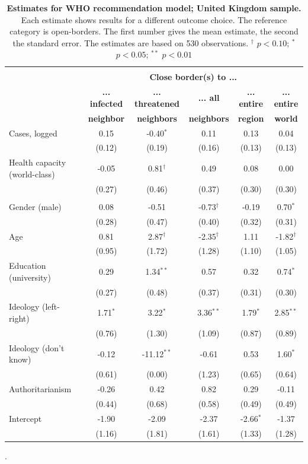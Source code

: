 \begin{table}[ht!]
\begin{center}
\footnotesize
\renewcommand{\arraystretch}{1.05}
\begin{tabular}{@{\extracolsep{4.8pt}}lccccc} 
\\[-1.8ex]\hline \\[-1.8ex]
 & \multicolumn{5}{c}{\normalsize{\textbf{Close border(s) to ...}}}
\\
  & \small{\textbf{... infected}} & \small{\textbf{... threatened}} & \small{\textbf{... all}} & \small{\textbf{... entire }} & \small{\textbf{... entire}}
 \\
  & \small{\textbf{neighbor}} & \small{\textbf{neighbors}} & \small{\textbf{neighbors}} & \small{\textbf{region}} & \small{\textbf{world}}
 \\
\hline
Cases, logged & 0.15 & -0.40$^{*}$ & 0.11 & 0.13 & 0.04\\
 & (0.12) & (0.19) & (0.16) & (0.13) & (0.13)\\
Health capacity (world-class) & -0.05 & 0.81$^{\dag}$ & 0.49 & 0.08 & 0.00\\
 & (0.27) & (0.46) & (0.37) & (0.30) & (0.30)\\
\\
Gender (male) & 0.08 & -0.51 & -0.73$^{\dag}$ & -0.19 & 0.70$^{*}$\\
 & (0.28) & (0.47) & (0.40) & (0.32) & (0.31)\\
Age & 0.81 & 2.87$^{\dag}$ & -2.35$^{\dag}$ & 1.11 & -1.82$^{\dag}$\\
 & (0.95) & (1.72) & (1.28) & (1.10) & (1.05)\\
Education (university) & 0.29 & 1.34$^{**}$ & 0.57 & 0.32 & 0.74$^{*}$\\
 & (0.27) & (0.48) & (0.37) & (0.31) & (0.30)\\
Ideology (left-right) & 1.71$^{*}$ & 3.22$^{*}$ & 3.36$^{**}$ & 1.79$^{*}$ & 2.85$^{**}$\\
 & (0.76) & (1.30) & (1.09) & (0.87) & (0.89)\\
Ideology (don't know) & -0.12 & -11.12$^{**}$ & -0.61 & 0.53 & 1.60$^{*}$\\
 & (0.61) & (0.00) & (1.23) & (0.65) & (0.64)\\
Authoritarianism & -0.26 & 0.42 & 0.82 & 0.29 & -0.11\\
 & (0.44) & (0.68) & (0.58) & (0.49) & (0.49)\\
Intercept & -1.90 & -2.09 & -2.37 & -2.66$^{*}$ & -1.37\\
 & (1.16) & (1.81) & (1.61) & (1.33) & (1.28)\\
\hline
\hline
\end{tabular}
\caption{\textbf{Estimates for WHO recommendation model; United Kingdom sample.} Each estimate shows results for a different outcome choice. The reference category is open-borders. The first number gives the mean estimate, 
                the second the standard error. The estimates are based on 530 observations. $^{\dag}$ $p < 0.10$; $^{*}$ $p < 0.05$; $^{**}$ $p < 0.01$}.
\label{Tab:MainUK_3}
\end{center}
\end{table}
